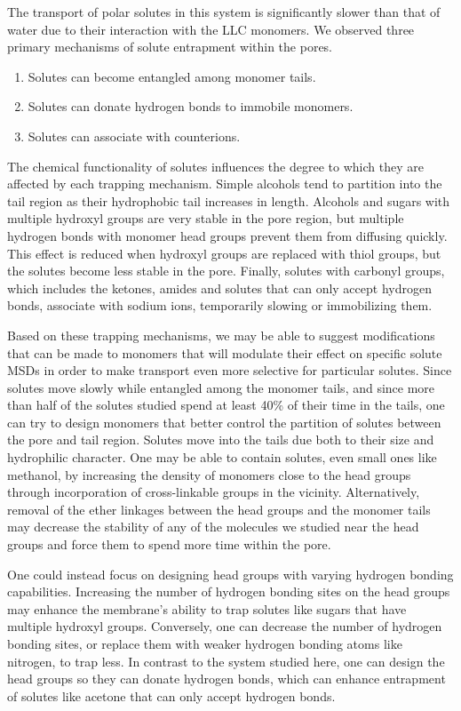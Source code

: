 \documentclass[journal=jpcbfk,manuscript=article]{achemso}
\begin{document}
  The transport of polar solutes in this system is significantly slower than
  that of water due to their interaction with the LLC monomers. We observed 
  three primary mechanisms of solute entrapment within the pores.
  \begin{enumerate}
    \item Solutes can become entangled among monomer tails. 
    \item Solutes can donate hydrogen bonds to immobile monomers.
    \item Solutes can associate with counterions.
  \end{enumerate}
  
  The chemical functionality of solutes influences the degree to which
  they are affected by each trapping mechanism. Simple alcohols tend to
  partition into the tail region as their hydrophobic tail increases in length.
  Alcohols and sugars with multiple hydroxyl groups are very stable in the pore
  region, but multiple hydrogen bonds with monomer head groups prevent them from
  diffusing quickly. This effect is reduced when hydroxyl groups are replaced
  with thiol groups, but the solutes become less stable in the pore. Finally,
  solutes with carbonyl groups, which includes the ketones, amides and solutes
  that can only accept hydrogen bonds, associate with sodium ions, temporarily
  slowing or immobilizing them. 

  Based on these trapping mechanisms, we may be able to suggest modifications
  that can be made to monomers that will modulate their effect on specific solute
  MSDs in order to make transport even more selective for particular solutes.
  Since solutes move slowly while entangled among the monomer tails, and since
  more than half of the solutes studied spend at least 40\% of their time in the
  tails, one can try to design monomers that better control the partition of
  solutes between the pore and tail region. Solutes move into the tails due both
  to their size and hydrophilic character. One may be able to contain solutes,
  even small ones like methanol, by increasing the density of monomers close to
  the head groups through incorporation of cross-linkable groups in the vicinity.
  Alternatively, removal of the ether linkages between the head groups and the
  monomer tails may decrease the stability of any of the molecules we studied
  near the head groups and force them to spend more time within the pore. 
  
  One could instead focus on designing head groups with varying hydrogen bonding
  capabilities. Increasing the number of hydrogen bonding sites on the head 
  groups may enhance the membrane's ability to trap solutes like sugars that 
  have multiple hydroxyl groups. Conversely, one can decrease the number of hydrogen
  bonding sites, or replace them with weaker hydrogen bonding atoms like nitrogen, to
  trap less. In contrast to the system studied here, one can design the head 
  groups so they can donate hydrogen bonds, which can enhance entrapment of 
  solutes like acetone that can only accept hydrogen bonds.
  
\end{document}
